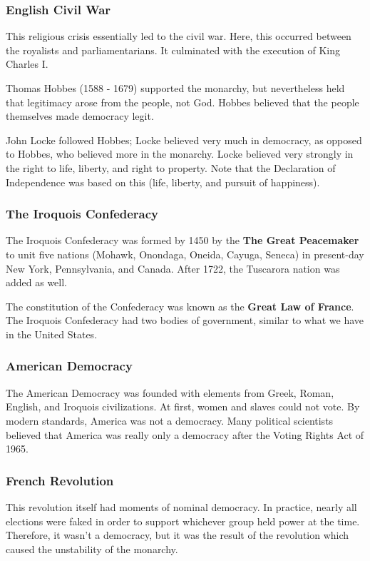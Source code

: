 \documentclass[letterpaper]{article}
\begin{document}
\subsubsection{English Civil War}
This religious crisis essentially led to the civil war. Here, this occurred between the royalists and parliamentarians. It culminated with the execution of King Charles I. 

\bigskip 

Thomas Hobbes (1588 - 1679) supported the monarchy, but nevertheless held that legitimacy arose from the people, not God. Hobbes believed that the people themselves made democracy legit. 

\bigskip 

John Locke followed Hobbes; Locke believed very much in democracy, as opposed to Hobbes, who believed more in the monarchy. Locke believed very strongly in the right to life, liberty, and right to property. Note that the Declaration of Independence was based on this (life, liberty, and pursuit of happiness). 

\subsubsection{The Iroquois Confederacy}
The Iroquois Confederacy was formed by 1450 by the \textbf{The Great Peacemaker} to unit five nations (Mohawk, Onondaga, Oneida, Cayuga, Seneca) in present-day New York, Pennsylvania, and Canada. After 1722, the Tuscarora nation was added as well. 

\bigskip 

The constitution of the Confederacy was known as the \textbf{Great Law of France}. The Iroquois Confederacy had two bodies of government, similar to what we have in the United States. 

\subsubsection{American Democracy}
The American Democracy was founded with elements from Greek, Roman, English, and Iroquois civilizations. At first, women and slaves could not vote. By modern standards, America was not a democracy. Many political scientists believed that America was really only a democracy after the Voting Rights Act of 1965. 

\subsubsection{French Revolution}
This revolution itself had moments of nominal democracy. In practice, nearly all elections were faked in order to support whichever group held power at the time. Therefore, it wasn't a democracy, but it was the result of the revolution which caused the unstability of the monarchy. 
\end{document}
